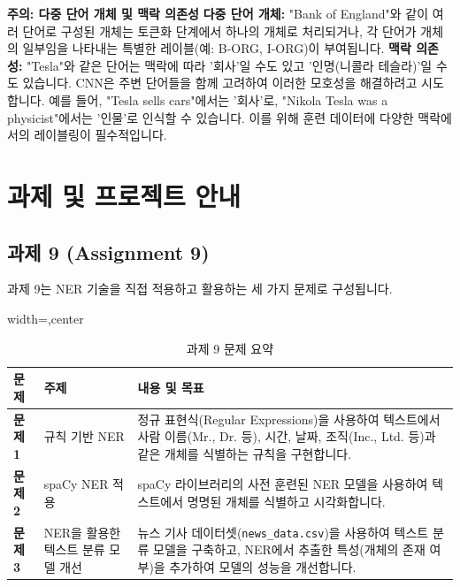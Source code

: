 \documentclass[11pt,a4paper]{article}
\begin{document}
\begin{warningbox}
\textbf{주의: 다중 단어 개체 및 맥락 의존성}
\textbf{다중 단어 개체:} "Bank of England"와 같이 여러 단어로 구성된 개체는 토큰화 단계에서 하나의 개체로 처리되거나, 각 단어가 개체의 일부임을 나타내는 특별한 레이블(예: B-ORG, I-ORG)이 부여됩니다.
\textbf{맥락 의존성:} "Tesla"와 같은 단어는 맥락에 따라 '회사'일 수도 있고 '인명(니콜라 테슬라)'일 수도 있습니다. CNN은 주변 단어들을 함께 고려하여 이러한 모호성을 해결하려고 시도합니다. 예를 들어, "Tesla sells cars"에서는 '회사'로, "Nikola Tesla was a physicist"에서는 '인물'로 인식할 수 있습니다. 이를 위해 훈련 데이터에 다양한 맥락에서의 레이블링이 필수적입니다.
\end{warningbox}

\newpage
\section*{과제 및 프로젝트 안내}

\subsection{과제 9 (Assignment 9)}
과제 9는 NER 기술을 직접 적용하고 활용하는 세 가지 문제로 구성됩니다.

\begin{table}[h!]
\caption{과제 9 문제 요약}
\label{tab:assignment9_summary}
\centering
\begin{adjustbox}{width=\textwidth,center}
\begin{tabular}{p{}p{}p{}}
\toprule
\textbf{문제} & \textbf{주제} & \textbf{내용 및 목표} \\
\midrule
\textbf{문제 1} & 규칙 기반 NER & 정규 표현식(Regular Expressions)을 사용하여 텍스트에서 사람 이름(Mr., Dr. 등), 시간, 날짜, 조직(Inc., Ltd. 등)과 같은 개체를 식별하는 규칙을 구현합니다. \\
\textbf{문제 2} & spaCy NER 적용 & spaCy 라이브러리의 사전 훈련된 NER 모델을 사용하여 텍스트에서 명명된 개체를 식별하고 시각화합니다. \\
\textbf{문제 3} & NER을 활용한 텍스트 분류 모델 개선 & 뉴스 기사 데이터셋(\texttt{news\_data.csv})을 사용하여 텍스트 분류 모델을 구축하고, NER에서 추출한 특성(개체의 존재 여부)을 추가하여 모델의 성능을 개선합니다. \\
\bottomrule
\end{tabular}
\end{adjustbox}
\end{table}
\end{document}
